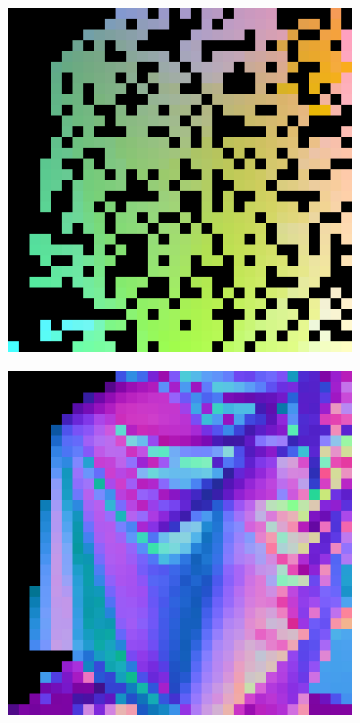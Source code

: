 \begin{figure}
	
	
	\begin{subfigure}[b]{0.24\linewidth}
		\includegraphics[width=\linewidth]{./Figures/gcnn_synthetic/eval_3_input.png}
	\end{subfigure}
	\begin{subfigure}[b]{0.24\linewidth}
		\includegraphics[width=\linewidth]{./Figures/gcnn_synthetic/eval_3_normal_GT.png}

\end{subfigure}
\end{figure}
